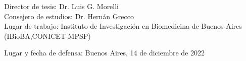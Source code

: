 \documentclass[./main.tex]{subfiles}
\begin{document}
\begin{adjustwidth}{-0.5in}{-0.5in}
{\begin{center}
\end{center}
\vspace{1cm}

{\large \noindent Director de tesis: Dr. Luis G. Morelli} \\
\noindent Consejero de estudios: Dr. Hernán Grecco \\
\noindent Lugar de trabajo: Instituto de Investigación en Biomedicina de Buenos Aires (IBioBA,CONICET-MPSP) \\
\vspace{0.3cm}

\noindent Lugar y fecha de defensa: Buenos Aires, 14 de diciembre de 2022}
\end{adjustwidth}
\end{document}
